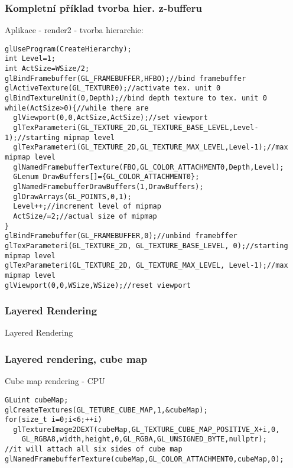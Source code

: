 \begin{frame}[fragile]
\frametitle{Kompletní příklad tvorba hier. z-bufferu}
		Aplikace - render2 - tvorba hierarchie:
		{\tiny
		\begin{verbatim}
glUseProgram(CreateHierarchy);
int Level=1;
int ActSize=WSize/2;
glBindFramebuffer(GL_FRAMEBUFFER,HFBO);//bind framebuffer
glActiveTexture(GL_TEXTURE0);//activate tex. unit 0
glBindTextureUnit(0,Depth);//bind depth texture to tex. unit 0
while(ActSize>0){//while there are
  glViewport(0,0,ActSize,ActSize);//set viewport
  glTexParameteri(GL_TEXTURE_2D,GL_TEXTURE_BASE_LEVEL,Level-1);//starting mipmap level
  glTexParameteri(GL_TEXTURE_2D,GL_TEXTURE_MAX_LEVEL,Level-1);//max mipmap level
  glNamedFramebufferTexture(FBO,GL_COLOR_ATTACHMENT0,Depth,Level);
  GLenum DrawBuffers[]={GL_COLOR_ATTACHMENT0};
  glNamedFramebufferDrawBuffers(1,DrawBuffers);
  glDrawArrays(GL_POINTS,0,1);
  Level++;//increment level of mipmap
  ActSize/=2;//actual size of mipmap
}
glBindFramebuffer(GL_FRAMEBUFFER,0);//unbind framebffer
glTexParameteri(GL_TEXTURE_2D, GL_TEXTURE_BASE_LEVEL, 0);//starting mipmap level
glTexParameteri(GL_TEXTURE_2D, GL_TEXTURE_MAX_LEVEL, Level-1);//max mipmap level
glViewport(0,0,WSize,WSize);//reset viewport
		\end{verbatim}
		}
\end{frame}


\begin{frame}
\frametitle{Layered Rendering}
\begin{center}
\Huge {\color{white}Layered Rendering}
\end{center}
\end{frame}

\begin{frame}[fragile]
\frametitle{Layered rendering, cube map}
Cube map rendering - CPU
{\tiny
\begin{verbatim}
GLuint cubeMap;
glCreateTextures(GL_TETURE_CUBE_MAP,1,&cubeMap);
for(size_t i=0;i<6;++i)
  glTextureImage2DEXT(cubeMap,GL_TEXTURE_CUBE_MAP_POSITIVE_X+i,0,
    GL_RGBA8,width,height,0,GL_RGBA,GL_UNSIGNED_BYTE,nullptr);
//it will attach all six sides of cube map
glNamedFramebufferTexture(cubeMap,GL_COLOR_ATTACHMENT0,cubeMap,0);
\end{verbatim}
}
\end{frame}

